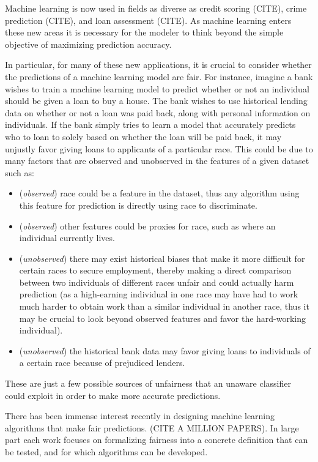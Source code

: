 Machine learning is now used in fields as diverse as credit scoring (CITE), crime prediction (CITE), and loan assessment (CITE). As machine learning enters these new areas it is necessary for the modeler to think beyond the simple objective of maximizing prediction accuracy.

In particular, for many of these new applications, it is crucial to consider whether the predictions of a machine learning model are fair. For instance, imagine a bank wishes to train a machine learning model to predict whether or not an individual should be given a loan to buy a house. The bank wishes to use historical lending data on whether or not a loan was paid back, along with personal information on individuals. If the bank simply tries to learn a model that accurately predicts who to loan to solely based on whether the loan will be paid back, it may unjustly favor giving loans to applicants of a particular race. This could be due to many factors that are observed and unobserved in the features of a given dataset such as:
\begin{itemize}
\item (\emph{observed}) race could be a feature in the dataset, thus any algorithm using this feature for prediction is directly using race to discriminate.
\item (\emph{observed}) other features could be proxies for race, such as where an individual currently lives.
\item (\emph{unobserved}) there may exist historical biases that make it more difficult for certain races to secure employment, thereby making a direct comparison between two individuals of different races unfair and could actually harm prediction (as a high-earning individual in one race may have had to work much harder to obtain work than a similar individual in another race, thus it may be crucial to look beyond observed features and favor the hard-working individual).
\item (\emph{unobserved}) the historical bank data may favor giving loans to individuals of a certain race because of prejudiced lenders.
\end{itemize}
These are just a few possible sources of unfairness that an unaware classifier could exploit in order to make more accurate predictions.

There has been immense interest recently in designing machine learning algorithms that make fair predictions. (CITE A MILLION PAPERS). In large part each work focuses on formalizing fairness into a concrete definition that can be tested, and for which algorithms can be developed. 

